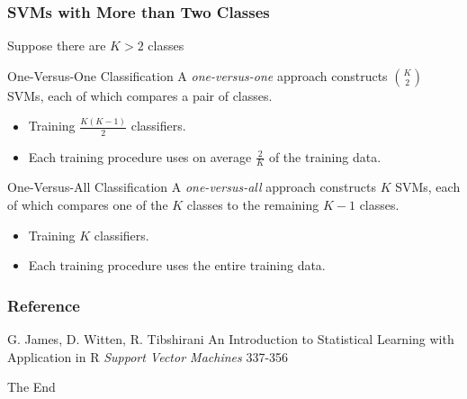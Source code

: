 \documentclass{beamer}
\begin{document}
\begin{frame}
    \frametitle{SVMs with More than Two Classes}
    Suppose there are $K>2$ classes
    \begin{block}{One-Versus-One Classification}
        A \textit{one-versus-one} approach constructs $K \choose 2$ SVMs, 
        each of which compares a pair of classes.
        \begin{itemize}
            \item Training $\frac{K(K-1)}{2}$ classifiers.
            \item Each training procedure uses on average $\frac{2}{K}$ of the training data.
        \end{itemize}
    \end{block}

    \begin{block}{One-Versus-All Classification}
        A \textit{one-versus-all} approach constructs $K$ SVMs, each of which 
        compares one of the $K$ classes to the remaining $K-1$ classes.
        \begin{itemize}
            \item Training $K$ classifiers.
            \item Each training procedure uses the entire training data.
        \end{itemize}
    \end{block}
\end{frame}

\begin{frame}
    \frametitle{Reference}
    \footnotesize{
        \begin{thebibliography}{99}
             G. James, D. Witten, R. Tibshirani
            \newblock An Introduction to Statistical Learning with Application in R
            \newblock \emph{Support Vector Machines} 337-356
        \end{thebibliography}
    }
\end{frame}

\begin{frame}
    \Huge{\centerline{The End}}
\end{frame}
\end{document}
